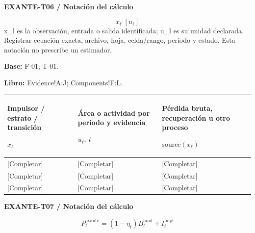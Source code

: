 \textbf{EXANTE-T06 / Notación del cálculo}\par
{\fontsize{9}{11}\selectfont\[ x_{\ell}\;[u_{\ell}] \]}
x\_l es la observación, entrada o salida identificada; u\_l es su unidad declarada. Registrar ecuación exacta, archivo, hoja, celda/rango, período y estado. Esta notación no prescribe un estimador.\par
\textbf{Base:} F-01; T-01.\par
\textbf{Libro:} Evidence!A:J; Components!F:L.\par\endgroup
{\sffamily\fontsize{8.3}{10.3}\selectfont\begin{longtable}{@{}P{54.83mm} P{54.83mm} P{54.83mm}@{}}
\toprule
\textbf{Impulsor / estrato / transición}\par {\normalfont\fontsize{8.2}{10}\selectfont $x_{\ell}$} & \textbf{Área o actividad por período y evidencia}\par {\normalfont\fontsize{8.2}{10}\selectfont $u_{\ell},\ t$} & \textbf{Pérdida bruta, recuperación u otro proceso}\par {\normalfont\fontsize{8.2}{10}\selectfont $\text{source}(x_{\ell})$}\\\midrule\endhead
\rule{0pt}{8mm}[Completar] & [Completar] & [Completar]\\\hline
\rule{0pt}{8mm}[Completar] & [Completar] & [Completar]\\\hline
\rule{0pt}{8mm}[Completar] & [Completar] & [Completar]\\\hline
\end{longtable}}
\par\begingroup\sffamily\fontsize{8}{10}\selectfont\color{NEBGreen}\setlength{\parskip}{2pt}\setlength{\abovedisplayskip}{4pt}\setlength{\belowdisplayskip}{4pt}\setlength{\abovedisplayshortskip}{2pt}\setlength{\belowdisplayshortskip}{3pt}
\textbf{EXANTE-T07 / Notación del cálculo}\par
{\fontsize{9}{11}\selectfont\[ P_t^{\mathrm{exante}}=(1-\eta_t)B_t^{\mathrm{land}}+I_t^{\mathrm{impl}} \]}
